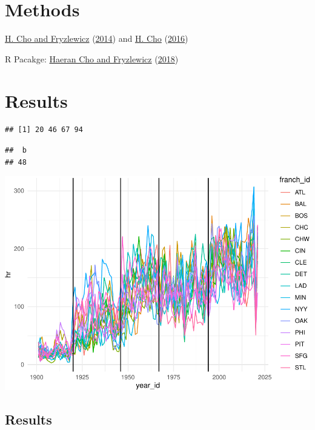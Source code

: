 \documentclass[
  12pt,
]{article}
\begin{document}
\hypertarget{methods}{%
\section{Methods}\label{methods}}

\protect\hyperlink{ref-ChoFryzlewwicz2014}{H. Cho and Fryzlewicz}
(\protect\hyperlink{ref-ChoFryzlewwicz2014}{2014}) and
\protect\hyperlink{ref-Cho2016}{H. Cho}
(\protect\hyperlink{ref-Cho2016}{2016})

R Pacakge: \protect\hyperlink{ref-hdbinseg}{Haeran Cho and Fryzlewicz}
(\protect\hyperlink{ref-hdbinseg}{2018})

\hypertarget{results}{%
\section{Results}\label{results}}

\begin{verbatim}
## [1] 20 46 67 94
\end{verbatim}

\begin{verbatim}
##  b 
## 48
\end{verbatim}

\begin{center}\includegraphics{paper_files/figure-latex/unnamed-chunk-1-1} \end{center}

\hypertarget{results-1}{%
\subsection{Results}\label{results-1}}
\end{document}
